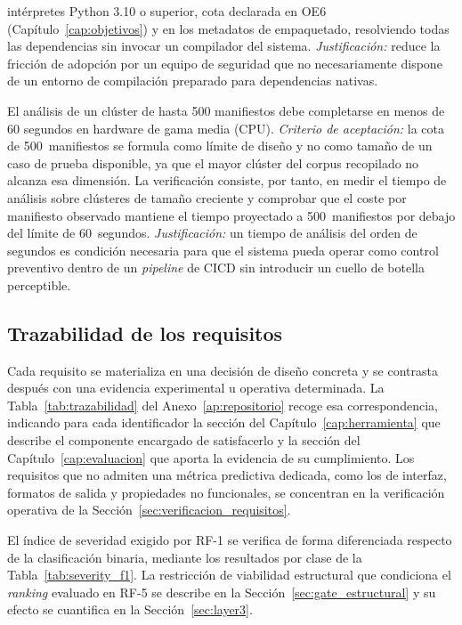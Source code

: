 \begin{description}
    intérpretes Python 3.10 o superior, cota declarada en OE6
    (Capítulo~\ref{cap:objetivos}) y en los metadatos de empaquetado, resolviendo
    todas las dependencias sin invocar un compilador del sistema.
    \textit{Justificación:} reduce la fricción de adopción por un equipo de
    seguridad que no necesariamente dispone de un entorno de compilación
    preparado para dependencias nativas.
  \item[RNF-4 — Latencia.] El análisis de un clúster de hasta 500 manifiestos debe
    completarse en menos de 60 segundos en hardware de gama media (CPU).
    \textit{Criterio de aceptación:} la cota de 500~manifiestos se formula como
    límite de diseño y no como tamaño de un caso de prueba disponible, ya que el
    mayor clúster del corpus recopilado no alcanza esa dimensión. La verificación
    consiste, por tanto, en medir el tiempo de análisis sobre clústeres de tamaño
    creciente y comprobar que el coste por manifiesto observado mantiene el tiempo
    proyectado a 500~manifiestos por debajo del límite de 60~segundos.
    \textit{Justificación:} un tiempo de análisis del orden de segundos es
    condición necesaria para que el sistema pueda operar como control preventivo
    dentro de un \textit{pipeline} de \acs{CICD} sin introducir un cuello de
    botella perceptible.
\end{description}

\subsection{Trazabilidad de los requisitos}

Cada requisito se materializa en una decisión de diseño concreta y se contrasta
después con una evidencia experimental u operativa determinada. La
Tabla~\ref{tab:trazabilidad} del Anexo~\ref{ap:repositorio} recoge esa
correspondencia, indicando para cada
identificador la sección del Capítulo~\ref{cap:herramienta} que describe el
componente encargado de satisfacerlo y la sección del
Capítulo~\ref{cap:evaluacion} que aporta la evidencia de su cumplimiento. Los
requisitos que no admiten una métrica predictiva dedicada, como los de interfaz,
formatos de salida y propiedades no funcionales, se concentran en la
verificación operativa de la Sección~\ref{sec:verificacion_requisitos}.

El índice de severidad exigido por RF-1 se verifica de forma diferenciada
respecto de la clasificación binaria, mediante los resultados por clase de la
Tabla~\ref{tab:severity_f1}. La restricción de viabilidad estructural que
condiciona el \textit{ranking} evaluado en RF-5 se describe en la
Sección~\ref{sec:gate_estructural} y su efecto se cuantifica en la
Sección~\ref{sec:layer3}.

